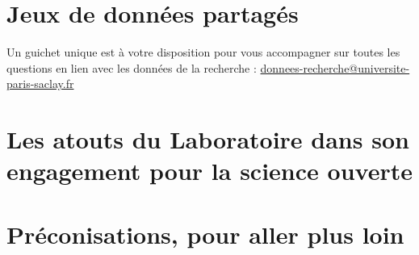 \documentclass[french, 11pt]{dibiso/biso}
\begin{document}
{\footnotesize\anrprojectsinfo}

\pagebreak

\section{Jeux de données partagés}

Un guichet unique est à votre disposition pour vous accompagner sur toutes les questions en lien avec les données de la recherche : \href{mailto:donnees-recherche@universite-paris-saclay.fr}{donnees-recherche@universite-paris-saclay.fr}







\pagebreak

\section{Les atouts du Laboratoire dans son engagement pour la science ouverte}








\section{Préconisations, pour aller plus loin}








\makelastpagereport
 
\end{document}
